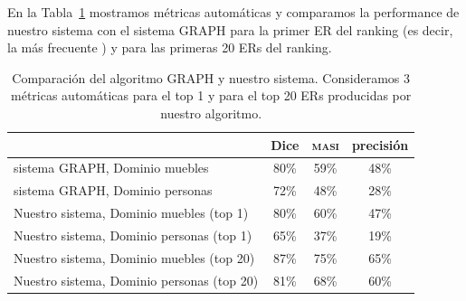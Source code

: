 En la Tabla~\ref{Tabla_sis_1_20} mostramos m\'etricas autom\'aticas y comparamos la performance de nuestro sistema con el sistema GRAPH para la primer ER del ranking (es decir, la m\'as frecuente ) y para las primeras 20 ERs del ranking.
\vspace*{2cm}
\begin{table}[h]
\begin{center}
\begin{tabular}{|l|c|c|c|}
\hline
	 	& 	Dice		&	\textsc{masi}	&	precisi\'on		\\
\hline
sistema GRAPH, Dominio muebles	& 	80\% 		&	59\%	&	48\%		 	\\
sistema GRAPH, Dominio personas 	& 	72\%		&	48\%	&	28\%			\\
\hline
Nuestro sistema, Dominio muebles (top 1)	&	80\%		&	60\%	&	47\%		\\
Nuestro sistema, Dominio personas (top 1)	&	65\%		&	37\%	&	19\%		\\
\hline
Nuestro sistema, Dominio muebles (top 20)&	87\%		&	75\%  	&	65\%		\\
Nuestro sistema, Dominio personas (top 20)   &	81\%		&68\%	&	60\%		\\
\hline
\end{tabular}
\caption{Comparaci\'on del algoritmo GRAPH y nuestro sistema. Consideramos 3 m\'etricas autom\'aticas para el top 1 y para el top 20 ERs producidas por nuestro algoritmo.}
\label{Tabla_sis_1_20}
\end{center}
\end{table}

